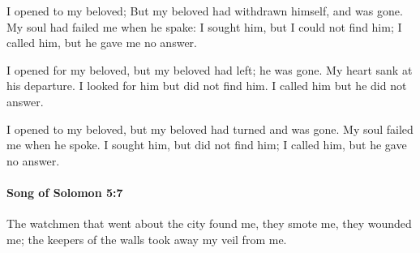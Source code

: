 			\begin{versebox}
					\item[BHS] 
					\item[LXX] 
					\item[ASV] I opened to my beloved; But my beloved had withdrawn himself, and was gone. My soul had failed me when he spake: I sought him, but I could not find him; I called him, but he gave me no answer.
					\item[NIV] I opened for my beloved, but my beloved had left; he was gone. My heart sank at his departure. I looked for him but did not find him. I called him but he did not answer.
					\item[NRSV] I opened to my beloved, but my beloved had turned and was gone. My soul failed me when he spoke. I sought him, but did not find him; I called him, but he gave no answer.
			\end{versebox}

		\paragraph{Song of Solomon 5:7} %
			\label{SONGOFSOLOMON-5-7}

			The watchmen that went about the city found me, they smote me, they wounded me; the keepers of the walls took away my veil from me.

